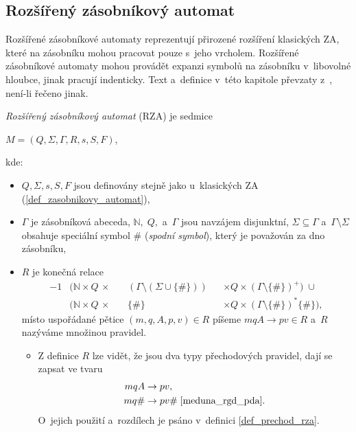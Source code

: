 \subsection*{Rozšířený zásobníkový automat}\label{kap_rozsireny_ZA}
Rozšířené zásobníkové automaty reprezentují přirozené rozšíření klasických ZA, které na zásobníku mohou pracovat pouze s~jeho vrcholem.
Rozšířené zásobníkové automaty mohou provádět expanzi symbolů na zásobníku v~libovolné hloubce, jinak pracují indenticky.
Text a~definice v~této kapitole převzaty z~\cite{meduna2023automata, meduna_zemek_2014}, není-li řečeno jinak.

\begin{definition}\label{def_rza}
    \emph{Rozšířený zásobníkový automat} (RZA) je sedmice
    \begin{center}
        $M = (Q, \Sigma, \Gamma, R, s, S, F)$,
    \end{center}
    kde:
    \begin{itemize}
        \item $Q, \Sigma, s, S, F$ jsou definovány stejně jako u~klasických ZA (\ref{def_zasobnikovy_automat}),
        \item $\Gamma$ je zásobníková abeceda, $\mathbb{N},\; Q,$ a~$\Gamma$ jsou navzájem disjunktní, $\Sigma \subseteq \Gamma$  a~$\Gamma \setminus \Sigma$ obsahuje speciální symbol $\#$ (\emph{spodní symbol}), který je považován za dno zásobníku, 
        \item $R$ je konečná relace
        \begin{alignat*}{-1}
             &(\mathbb{N} \times Q \,\times \,&& (\Gamma \setminus (\Sigma \cup \{\#\})) &&\times Q \times (\Gamma \setminus \{\#\})^+) \;\cup \\
             &(\mathbb{N} \times Q \,\times \,&& \{\#\} &&\times Q \times (\Gamma \setminus \{\#\})^*\{\#\}),
        \end{alignat*}
        místo uspořádané pětice $(m, q, A, p, v) \in R$ píšeme $mqA \rightarrow pv \in R$ a~$R$ nazýváme množinou pravidel.
        \begin{itemize}[label=$\circ$]
            \item Z definice $R$ lze vidět, že jsou dva typy přechodových pravidel, dají se zapsat ve tvaru
            \begin{align*}
                mqA  &\rightarrow pv,\\
                mq\# &\rightarrow pv\# \; \cite{meduna_rgd_pda}.
            \end{align*}
            O~jejich použití a~rozdílech je psáno v~definici \ref{def_prechod_rza}.
        \end{itemize}
    \end{itemize}
\end{definition}

